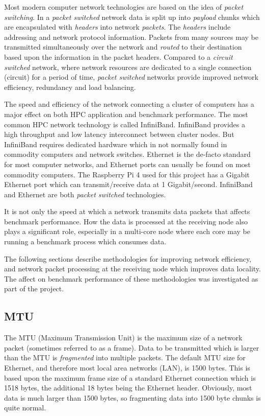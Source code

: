 Most modern computer network technologies are based on the idea of \emph{packet switching}. In a \emph{packet switched} network data is split up into \emph{payload} chunks which are encapsulated with \emph{headers} into network \emph{packets}. The \emph{headers} include addressing and network protocol information. Packets from many sources may be transmitted simultaneously over the network and \emph{routed} to their destination based upon the information in the packet headers. Compared to a \emph{circuit switched} network, where network resources are dedicated to a single connection (circuit) for a period of time, \emph{packet switched} networks provide improved network efficiency, redundancy and load balancing.

The speed and efficiency of the network connecting a cluster of computers has a major effect on both HPC application and benchmark performance. The most common HPC network technology is called InfiniBand. InfiniBand provides a high throughput and low latency interconnect between cluster nodes. But InfiniBand requires dedicated hardware which in not normally found in commodity computers and network switches. Ethernet is the de-facto standard for most computer networks, and Ethernet ports can usually be found on most commodity computers. The Raspberry Pi 4 used for this project has a Gigabit Ethernet port which can transmit/receive data at 1 Gigabit/second. InfiniBand and Ethernet are both \emph{packet switched} technologies.

It is not only the speed at which a network transmits data packets that affects benchmark performance. How the data is processed at the receiving node also plays a significant role, especially in a multi-core node where each core may be running a benchmark process which consumes data.

The following sections describe methodologies for improving network efficiency, and network packet processing at the receiving node which improves data locality. The affect on benchmark performance of these methodologies was investigated as part of the project.


\subsection{MTU}

The MTU (Maximum Transmission Unit) is the maximum size of a network packet (sometimes referred to as a frame). Data to be transmitted which is larger than the MTU is \emph{fragmented} into multiple packets. The default MTU size for Ethernet, and therefore most local area networks (LAN), is 1500 bytes. This is based upon the maximum frame size of a standard Ethernet connection which is 1518 bytes, the additional 18 bytes being the Ethernet header. Obviously, most data is much larger than 1500 bytes, so fragmenting data into 1500 byte chunks is quite normal.


